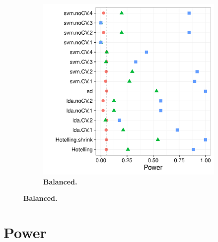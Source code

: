 \documentclass[12pt,a4paper]{article}
\theoremstyle{definition}
\begin{document}
\begin{figure}[h]
\begin{subfigure}{.5\textwidth}
\includegraphics[width=1\linewidth]{"art/2016-07-27 11:42:05"}
\caption{\textbf{Balanced.}} %
\label{fig:simulation_12}
\end{subfigure}
\end{figure}




\section{Power}
\label{sec:power}
\end{document}
